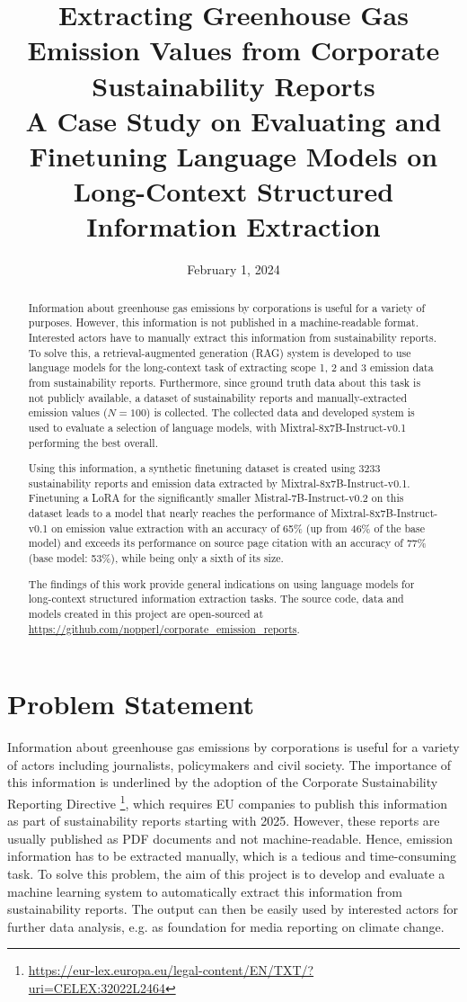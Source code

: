 \documentclass[]{article}
\title{Extracting Greenhouse Gas Emission Values from Corporate Sustainability Reports\\
\large A Case Study on Evaluating and Finetuning Language Models on Long-Context Structured Information Extraction}
\date{February 1, 2024}
\begin{document}
\maketitle


\begin{abstract}
Information about greenhouse gas emissions by corporations is useful for a variety of purposes. However, this information is not published in a machine-readable format. Interested actors have to manually extract this information from sustainability reports. To solve this, a retrieval-augmented generation (RAG) system is developed to use language models for the long-context task of extracting scope 1, 2 and 3 emission data from sustainability reports. Furthermore, since ground truth data about this task is not publicly available, a dataset of sustainability reports and manually-extracted emission values ($N=100$) is collected. The collected data and developed system is used to evaluate a selection of language models, with Mixtral-8x7B-Instruct-v0.1 performing the best overall.

Using this information, a synthetic finetuning dataset is created using 3233 sustainability reports and emission data extracted by Mixtral-8x7B-Instruct-v0.1. Finetuning a LoRA for the significantly smaller Mistral-7B-Instruct-v0.2 on this dataset leads to a model that nearly reaches the performance of Mixtral-8x7B-Instruct-v0.1 on emission value extraction with an accuracy of 65\% (up from 46\% of the base model) and exceeds its performance on source page citation with an accuracy of 77\% (base model: 53\%), while being only a sixth of its size.

The findings of this work provide general indications on using language models for long-context structured information extraction tasks. The source code, data and models created in this project are open-sourced at \url{https://github.com/nopperl/corporate_emission_reports}.
\end{abstract}



\section{Problem Statement}
\label{sec:introduction}
Information about greenhouse gas emissions by corporations is useful for a variety of actors including journalists, policymakers and civil society. The importance of this information is underlined by the adoption of the Corporate Sustainability Reporting Directive \footnote{\url{https://eur-lex.europa.eu/legal-content/EN/TXT/?uri=CELEX:32022L2464}}, which requires EU companies to publish this information as part of sustainability reports starting with 2025. However, these reports are usually published as PDF documents and not machine-readable. Hence, emission information has to be extracted manually, which is a tedious and time-consuming task. To solve this problem, the aim of this project is to develop and evaluate a machine learning system to automatically extract this information from sustainability reports. The output can then be easily used by interested actors for further data analysis, e.g. as foundation for media reporting on climate change.
\end{document}
